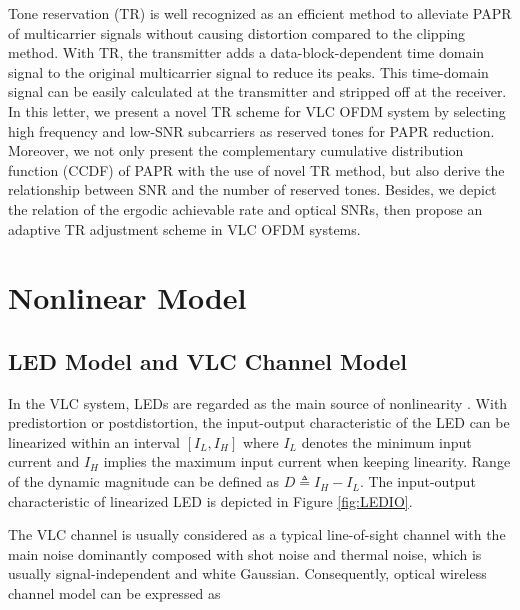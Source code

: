 \documentclass[9pt,twocolumn,twoside]{osajnl}
\begin{document}
Tone reservation (TR) \cite{yu2015low,jacklin2011convex,hu2014tone} is well recognized as an efficient method to alleviate PAPR of multicarrier signals without causing distortion compared to the clipping method. With TR, the transmitter adds a data-block-dependent time domain signal 
to the original multicarrier signal to reduce its peaks. This time-domain signal can be easily calculated at the transmitter and stripped off at the receiver. In this letter, we present a novel TR scheme for VLC OFDM system by selecting high frequency and 
low-SNR subcarriers as reserved tones for PAPR reduction. Moreover, we not only present the complementary cumulative distribution 
function (CCDF) of PAPR with the use of novel TR method, but also derive the relationship between SNR and the number of reserved tones. Besides, we depict the relation of the ergodic achievable rate and optical SNRs, then propose an adaptive 
TR adjustment scheme in VLC OFDM systems.


\section{Nonlinear Model}
\label{sec: nonlinear model}

\subsection{LED Model and VLC Channel Model}

In the VLC system, LEDs are regarded as the main source of nonlinearity \cite{siuzdak2018modeling}. With predistortion 
or postdistortion, the input-output characteristic of the LED can be linearized within an 
interval $[I_L, I_H]$ where $I_L$ denotes the minimum input current and $I_H$ implies the 
maximum input current when keeping linearity. Range of the dynamic magnitude can be defined as $D \triangleq I_H-I_L$. 
The input-output characteristic of linearized LED is depicted in Figure \ref{fig:LEDIO}.

The VLC channel is usually considered as a typical line-of-sight channel with the main noise 
dominantly composed with shot noise and thermal noise, which is usually signal-independent and white 
Gaussian. Consequently, optical wireless channel model can be expressed as
\end{document}
